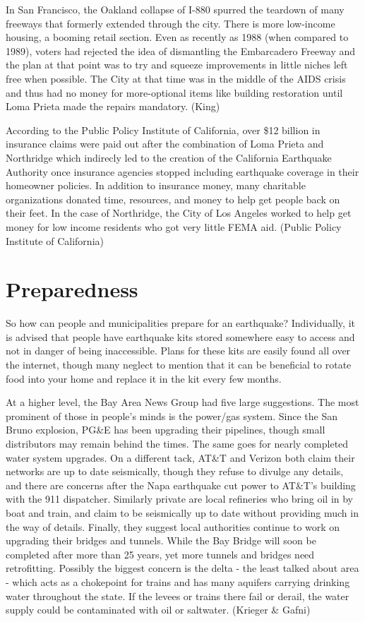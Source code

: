 \documentclass[12pt]{article}
\begin{document}
In San Francisco, the Oakland collapse of I-880 spurred the teardown of many freeways that formerly extended through the city.  There is more low-income housing, a booming retail section.  Even as recently as 1988 (when compared to 1989), voters had rejected the idea of dismantling the Embarcadero Freeway and the plan at that point was to try and squeeze improvements in little niches left free when possible.  The City at that time was in the middle of the AIDS crisis and thus had no money for more-optional items like building restoration until Loma Prieta made the repairs mandatory. (King)

According to the Public Policy Institute of California, over \$12 billion in insurance claims were paid out after the combination of Loma Prieta and Northridge which indirecly led to the creation of the California Earthquake Authority once insurance agencies stopped including earthquake coverage in their homeowner policies.  In addition to insurance money, many charitable organizations donated time, resources, and money to help get people back on their feet.  In the case of Northridge, the City of Los Angeles worked to help get money for low income residents who got very little FEMA aid. (Public Policy Institute of California)

\section*{Preparedness}

So how can people and municipalities prepare for an earthquake?  Individually, it is advised that people have earthquake kits stored somewhere easy to access and not in danger of being inaccessible.  Plans for these kits are easily found all over the internet, though many neglect to mention that it can be beneficial to rotate food into your home and replace it in the kit every few months.

At a higher level, the Bay Area News Group had five large suggestions.  The most prominent of those in people's minds is the power/gas system.  Since the San Bruno explosion, PG\&E has been upgrading their pipelines, though small distributors may remain behind the times.  The same goes for nearly completed water system upgrades.  On a different tack, AT\&T and Verizon both claim their networks are up to date seismically, though they refuse to divulge any details, and there are concerns after the Napa earthquake cut power to AT\&T's building with the 911 dispatcher.  Similarly private are local refineries who bring oil in by boat and train, and claim to be seismically up to date without providing much in the way of details.  Finally, they suggest local authorities continue to work on upgrading their bridges and tunnels.  While the Bay Bridge will soon be completed after more than 25 years, yet more tunnels and bridges need retrofitting.  Possibly the biggest concern is the delta - the least talked about area - which acts as a chokepoint for trains and has many aquifers carrying drinking water throughout the state.  If the levees or trains there fail or derail, the water supply could be contaminated with oil or saltwater.  (Krieger \& Gafni)
\end{document}
